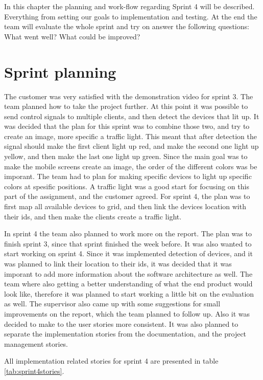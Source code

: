 In this chapter the planning and work-flow regarding Sprint 4 will be described. 
Everything from setting our goals to implementation and testing. At the end the team will evaluate the whole sprint and try on answer the following questions: What went well? What could be improved? 
\section{Sprint planning}

The customer was very satisfied with the demonstration video for sprint 3. The team planned how to take the project further. At this point it was possible to send control signals to multiple clients, and then detect the devices that lit up. It was decided that the plan for this sprint was to combine those two, and try to create an image, more specific a traffic light. This meant that after detection the signal should make the first client light up red, and make the second one light up yellow, and then make the last one light up green. Since the main goal was to make the mobile screens create an image, the order of the different colors was be imporant. The team had to plan for making specific devices to light up specific colors at spesific positions. A traffic light was a good start for focusing on this part of the assignment, and the customer agreed. For sprint 4, the plan was to first map all available devices to grid, and then link the devices location with their ids, and then make the clients create a traffic light.  


In sprint 4 the team also planned to work more on the report. The plan was to finish sprint 3, since that sprint finished the week before. It was also wanted to start working on sprint 4. Since it was implemented detection of devices, and it was planned to link their location to their ids, it was decided that it was imporant to add more information about the software architecture as well. The team where also getting a better understanding of what the end product would look like, therefore it was planned to start working a little bit on the evaluation as well. The supervisor also came up with some suggestions for small improvements on the report, which the team planned to follow up. Also it was decided to make to the user stories more consistent. It was also planned to separate the implementation stories from the documentation, and the project management stories.


All implementation related stories for sprint 4 are presented in table \ref{tab:sprint4stories}.


